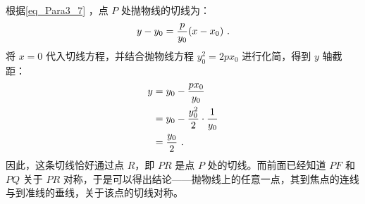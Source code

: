 根据\autoref{eq_Para3_7} ，点 $P$ 处抛物线的切线为：
\begin{equation}
y-y_0={p\over y_0}(x-x_0)~.
\end{equation}
将 $x = 0$ 代入切线方程，并结合抛物线方程 $y_0^2 = 2px_0$ 进行化简，得到 $y$ 轴截距：
\begin{equation}
\begin{split}
y&=y_0-{px_0\over y_0}\\
&=y_0-{y_0^2\over 2}\cdot{1\over y_0}\\
&={y_0\over 2}~.
\end{split}
\end{equation}
因此，这条切线恰好通过点 $R$，即 $PR$ 是点 $P$ 处的切线。而前面已经知道 $PF$ 和 $PQ$ 关于 $PR$ 对称，于是可以得出结论——抛物线上的任意一点，其到焦点的连线与到准线的垂线，关于该点的切线对称。

